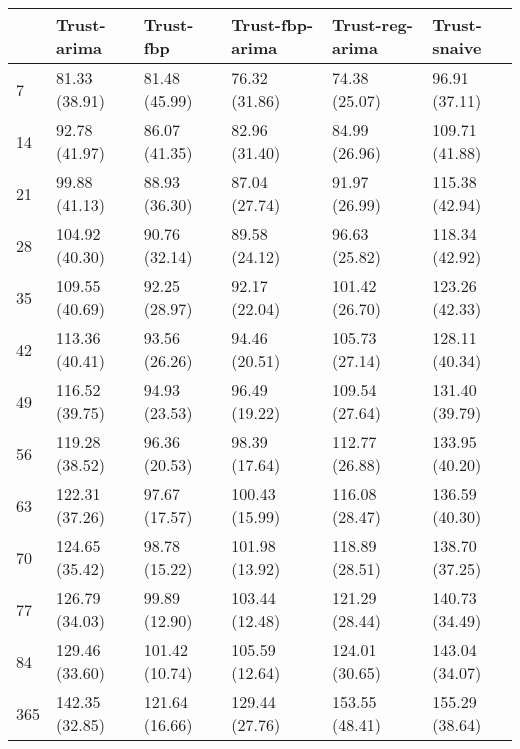 \begin{tabular}{llllll}
\toprule
{} &     Trust-arima &       Trust-fbp & Trust-fbp-arima & Trust-reg-arima &    Trust-snaive \\
\midrule
7   &   81.33 (38.91) &   81.48 (45.99) &   76.32 (31.86) &   74.38 (25.07) &   96.91 (37.11) \\
14  &   92.78 (41.97) &   86.07 (41.35) &   82.96 (31.40) &   84.99 (26.96) &  109.71 (41.88) \\
21  &   99.88 (41.13) &   88.93 (36.30) &   87.04 (27.74) &   91.97 (26.99) &  115.38 (42.94) \\
28  &  104.92 (40.30) &   90.76 (32.14) &   89.58 (24.12) &   96.63 (25.82) &  118.34 (42.92) \\
35  &  109.55 (40.69) &   92.25 (28.97) &   92.17 (22.04) &  101.42 (26.70) &  123.26 (42.33) \\
42  &  113.36 (40.41) &   93.56 (26.26) &   94.46 (20.51) &  105.73 (27.14) &  128.11 (40.34) \\
49  &  116.52 (39.75) &   94.93 (23.53) &   96.49 (19.22) &  109.54 (27.64) &  131.40 (39.79) \\
56  &  119.28 (38.52) &   96.36 (20.53) &   98.39 (17.64) &  112.77 (26.88) &  133.95 (40.20) \\
63  &  122.31 (37.26) &   97.67 (17.57) &  100.43 (15.99) &  116.08 (28.47) &  136.59 (40.30) \\
70  &  124.65 (35.42) &   98.78 (15.22) &  101.98 (13.92) &  118.89 (28.51) &  138.70 (37.25) \\
77  &  126.79 (34.03) &   99.89 (12.90) &  103.44 (12.48) &  121.29 (28.44) &  140.73 (34.49) \\
84  &  129.46 (33.60) &  101.42 (10.74) &  105.59 (12.64) &  124.01 (30.65) &  143.04 (34.07) \\
365 &  142.35 (32.85) &  121.64 (16.66) &  129.44 (27.76) &  153.55 (48.41) &  155.29 (38.64) \\
\bottomrule
\end{tabular}
